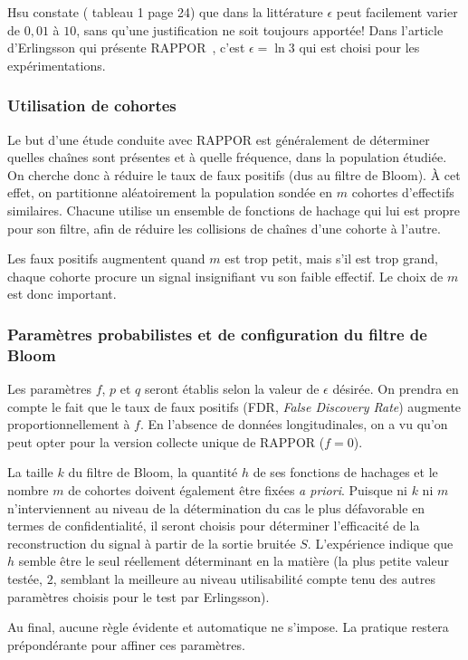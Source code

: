 \documentclass[a4paper,11pt]{article} %
\begin{document}
Hsu constate (\cite{HGHK14} tableau 1 page 24) que  dans la littérature $\epsilon$ peut facilement varier de $0,01$ à $10$, sans qu'une justification ne soit toujours apportée! Dans l'article d'Erlingsson qui présente RAPPOR~\cite{EPK14}, c'est $\epsilon=\ln 3$ qui est choisi pour les expérimentations.
%
\subsubsection{Utilisation de cohortes}
%
Le but d'une étude conduite avec RAPPOR est généralement de déterminer quelles chaînes sont présentes et à quelle fréquence, dans la population étudiée. 
On cherche donc à réduire le taux de faux positifs (dus au filtre de Bloom). 
À cet effet, on partitionne aléatoirement la population sondée en $m$ cohortes d'effectifs similaires.
Chacune utilise un ensemble de fonctions de hachage qui lui est propre pour son filtre, afin de réduire les collisions de chaînes d'une cohorte à l'autre. 

Les faux positifs augmentent quand $m$ est trop petit, mais s'il est trop grand, chaque cohorte procure un signal insignifiant vu son faible effectif. Le choix de $m$ est donc important.
%
\subsubsection{Paramètres probabilistes et de configuration du filtre de Bloom}
%
Les paramètres $f$, $p$ et $q$ seront établis selon la valeur de $\epsilon$ désirée. On prendra en compte le fait que le taux de faux positifs (FDR, \emph{False Discovery Rate}) augmente proportionnellement à $f$. En l'absence de données longitudinales, on a vu qu'on peut opter pour la version \og collecte unique\fg{} de RAPPOR ($f=0$).

La taille $k$ du filtre de Bloom, la quantité $h$ de ses fonctions de hachages et le nombre $m$ de cohortes doivent également être fixées \textit{a priori}. Puisque ni $k$ ni $m$ n'interviennent au niveau de la détermination du cas le plus défavorable en termes de confidentialité, il seront choisis pour déterminer l'efficacité de la reconstruction du signal à partir de la sortie bruitée $S$. 
L'expérience indique que $h$ semble être le seul réellement déterminant en la matière (la plus petite valeur testée, $2$, semblant la meilleure au niveau utilisabilité compte tenu des autres paramètres choisis pour le test par Erlingsson\cite{EPK14}).


Au final, aucune règle évidente et automatique ne s'impose. La pratique restera prépondérante pour affiner ces paramètres.
%
\end{document}
